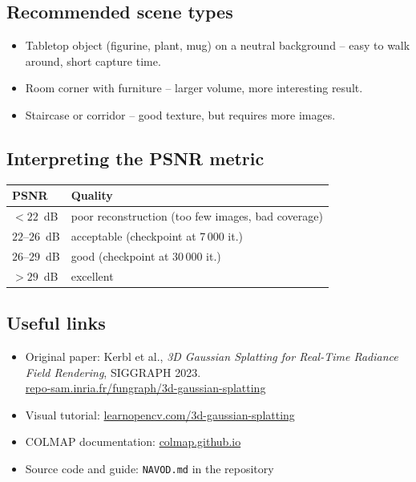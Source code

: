 \documentclass{article}
\begin{document}
\subsection*{Recommended scene types}

\begin{itemize}
    \item Tabletop object (figurine, plant, mug) on a neutral background --
          easy to walk around, short capture time.
    \item Room corner with furniture -- larger volume, more interesting result.
    \item Staircase or corridor -- good texture, but requires more images.
\end{itemize}

\subsection*{Interpreting the PSNR metric}

\begin{center}
\begin{tabular}{ll}
\toprule
PSNR & Quality \\
\midrule
$< 22$~dB & poor reconstruction (too few images, bad coverage) \\
$22$--$26$~dB & acceptable (checkpoint at 7\,000 it.) \\
$26$--$29$~dB & good (checkpoint at 30\,000 it.) \\
$> 29$~dB & excellent \\
\bottomrule
\end{tabular}
\end{center}

\subsection*{Useful links}

\begin{itemize}
    \item Original paper: Kerbl et al., \textit{3D Gaussian Splatting for
          Real-Time Radiance Field Rendering}, SIGGRAPH 2023.\\
          \href{https://repo-sam.inria.fr/fungraph/3d-gaussian-splatting/}{repo-sam.inria.fr/fungraph/3d-gaussian-splatting}
    \item Visual tutorial:
          \href{https://learnopencv.com/3d-gaussian-splatting/}{learnopencv.com/3d-gaussian-splatting}
    \item COLMAP documentation:
          \href{https://colmap.github.io/}{colmap.github.io}
    \item Source code and guide: \texttt{NAVOD.md} in the repository
\end{itemize}
\end{document}
